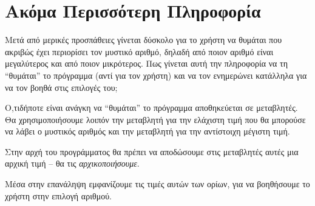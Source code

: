 \documentclass[a4paper,11pt,oneside]{book}
\begin{document}

\clearpage
\section{Ακόμα Περισσότερη Πληροφορία}

\begin{question}
Μετά από μερικές προσπάθειες γίνεται δύσκολο για το χρήστη να θυμάται που ακριβώς έχει περιορίσει
τον μυστικό αριθμό, δηλαδή από ποιον αριθμό είναι μεγαλύτερος και από ποιον μικρότερος.
Πως γίνεται αυτή την πληροφορία να τη ``θυμάται'' το πρόγραμμα (αντί για τον χρήστη) και να τον
ενημερώνει κατάλληλα για να τον βοηθά στις επιλογές του;
\end{question}

Ο,τιδήποτε είναι ανάγκη να ``θυμάται'' το πρόγραμμα αποθηκεύεται σε μεταβλητές. Θα χρησιμοποιήσουμε λοιπόν την μεταβλητή  για την ελάχιστη τιμή που θα μπορούσε να λάβει ο μυστικός αριθμός και την μεταβλητή  για την αντίστοιχη μέγιστη τιμή.

Στην αρχή του προγράμματος θα πρέπει να αποδώσουμε στις μεταβλητές αυτές μια αρχική τιμή -- θα τις \emph{αρχικοποιήσουμε}. 


Μέσα στην επανάληψη εμφανίζουμε τις τιμές αυτών των ορίων, για να βοηθήσουμε το χρήστη στην επιλογή αριθμού. 

\end{document}
